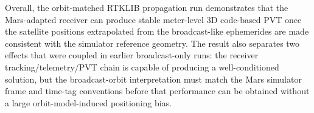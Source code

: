Overall, the orbit-matched RTKLIB propagation run demonstrates that the Mars-adapted
receiver can produce stable meter-level 3D code-based PVT once the satellite
positions extrapolated from the broadcast-like ephemerides are made consistent with
the simulator reference geometry. The result also separates two effects that were
coupled in earlier broadcast-only runs: the receiver tracking/telemetry/PVT chain is
capable of producing a well-conditioned solution, but the broadcast-orbit
interpretation must match the Mars simulator frame and time-tag conventions before
that performance can be obtained without a large orbit-model-induced positioning
bias.
